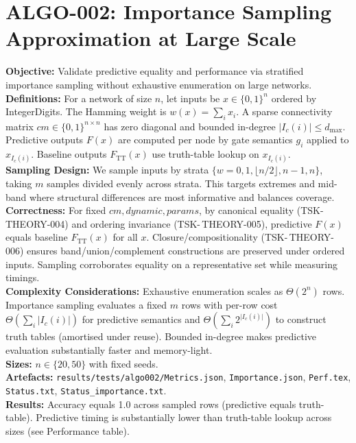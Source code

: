 \documentclass[11pt]{article}
\begin{document}
\section{ALGO-002: Importance Sampling Approximation at Large Scale}
\textbf{Objective:} Validate predictive equality and performance via stratified importance sampling without exhaustive enumeration on large networks.\\
\textbf{Definitions:} For a network of size \(n\), let inputs be \(x\in\{0,1\}^n\) ordered by IntegerDigits. The Hamming weight is \(w(x)=\sum_i x_i\). A sparse connectivity matrix \(cm\in\{0,1\}^{n\times n}\) has zero diagonal and bounded in-degree \(\lvert I_c(i)\rvert\le d_{\max}\). Predictive outputs \(F(x)\) are computed per node by gate semantics \(g_i\) applied to \(x_{I_c(i)}\). Baseline outputs \(F_\mathrm{TT}(x)\) use truth-table lookup on \(x_{I_c(i)}\).\\
\textbf{Sampling Design:} We sample inputs by strata \(\{w=0,1,\lfloor n/2\rfloor,n-1,n\}\), taking \(m\) samples divided evenly across strata. This targets extremes and mid-band where structural differences are most informative and balances coverage.\\
\textbf{Correctness:} For fixed \(cm, dynamic, params\), by canonical equality (TSK-\,THEORY-004) and ordering invariance (TSK-\,THEORY-005), predictive \(F(x)\) equals baseline \(F_\mathrm{TT}(x)\) for all \(x\). Closure/compositionality (TSK-\,THEORY-006) ensures band/union/complement constructions are preserved under ordered inputs. Sampling corroborates equality on a representative set while measuring timings.\\
\textbf{Complexity Considerations:} Exhaustive enumeration scales as \(\Theta(2^n)\) rows. Importance sampling evaluates a fixed \(m\) rows with per-row cost \(\Theta(\sum_i \lvert I_c(i)\rvert)\) for predictive semantics and \(\Theta(\sum_i 2^{\lvert I_c(i)\rvert})\) to construct truth tables (amortised under reuse). Bounded in-degree makes predictive evaluation substantially faster and memory-light.\\
\textbf{Sizes:} \(n\in\{20,50\}\) with fixed seeds.\\
\textbf{Artefacts:} \texttt{results/tests/algo002/Metrics.json}, \texttt{Importance.json}, \texttt{Perf.tex}, \texttt{Status.txt}, \texttt{Status\_importance.txt}.\\
\textbf{Results:} Accuracy equals 1.0 across sampled rows (predictive equals truth-table). Predictive timing is substantially lower than truth-table lookup across sizes (see Performance table).\\
\end{document}
